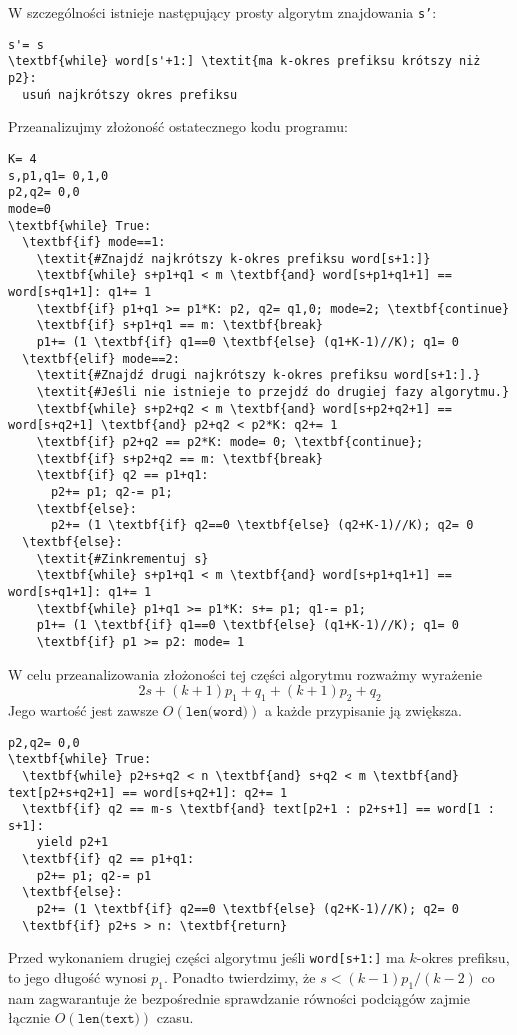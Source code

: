 W szczególności istnieje następujący prosty algorytm znajdowania \texttt{s'}:
\begin{verbatim}
s'= s
\textbf{while} word[s'+1:] \textit{ma k-okres prefiksu krótszy niż p2}:
  usuń najkrótszy okres prefiksu
\end{verbatim}
Przeanalizujmy złożoność ostatecznego kodu programu:
\begin{verbatim}
K= 4
s,p1,q1= 0,1,0
p2,q2= 0,0
mode=0
\textbf{while} True:
  \textbf{if} mode==1:
    \textit{#Znajdź najkrótszy k-okres prefiksu word[s+1:]}
    \textbf{while} s+p1+q1 < m \textbf{and} word[s+p1+q1+1] == word[s+q1+1]: q1+= 1
    \textbf{if} p1+q1 >= p1*K: p2, q2= q1,0; mode=2; \textbf{continue}
    \textbf{if} s+p1+q1 == m: \textbf{break}
    p1+= (1 \textbf{if} q1==0 \textbf{else} (q1+K-1)//K); q1= 0
  \textbf{elif} mode==2:
    \textit{#Znajdź drugi najkrótszy k-okres prefiksu word[s+1:].}
    \textit{#Jeśli nie istnieje to przejdź do drugiej fazy algorytmu.}
    \textbf{while} s+p2+q2 < m \textbf{and} word[s+p2+q2+1] == word[s+q2+1] \textbf{and} p2+q2 < p2*K: q2+= 1
    \textbf{if} p2+q2 == p2*K: mode= 0; \textbf{continue};
    \textbf{if} s+p2+q2 == m: \textbf{break}
    \textbf{if} q2 == p1+q1:
      p2+= p1; q2-= p1;
    \textbf{else}:
      p2+= (1 \textbf{if} q2==0 \textbf{else} (q2+K-1)//K); q2= 0
  \textbf{else}:
    \textit{#Zinkrementuj s}
    \textbf{while} s+p1+q1 < m \textbf{and} word[s+p1+q1+1] == word[s+q1+1]: q1+= 1
    \textbf{while} p1+q1 >= p1*K: s+= p1; q1-= p1;
    p1+= (1 \textbf{if} q1==0 \textbf{else} (q1+K-1)//K); q1= 0
    \textbf{if} p1 >= p2: mode= 1
\end{verbatim}
W celu przeanalizowania złożoności tej części algorytmu rozważmy wyrażenie
\[
2s+{\left(k+1\right)}p_1+q_1+{\left(k+1\right)}p_2+q_2
\]
Jego wartość jest zawsze $O{\left(\texttt{len(word)}\right)}$ a każde przypisanie ją zwiększa.
\begin{verbatim}
p2,q2= 0,0
\textbf{while} True:
  \textbf{while} p2+s+q2 < n \textbf{and} s+q2 < m \textbf{and} text[p2+s+q2+1] == word[s+q2+1]: q2+= 1
  \textbf{if} q2 == m-s \textbf{and} text[p2+1 : p2+s+1] == word[1 : s+1]:
    yield p2+1
  \textbf{if} q2 == p1+q1:
    p2+= p1; q2-= p1
  \textbf{else}:
    p2+= (1 \textbf{if} q2==0 \textbf{else} (q2+K-1)//K); q2= 0
  \textbf{if} p2+s > n: \textbf{return}
\end{verbatim}
Przed wykonaniem drugiej części algorytmu jeśli \texttt{word[s+1:]} ma \(k\)-okres prefiksu, to jego długość wynosi \(p_1\).
Ponadto twierdzimy, że \(s<{\left(k-1\right)}p_1/{\left(k-2\right)}\) co nam zagwarantuje że bezpośrednie sprawdzanie równości podciągów zajmie łącznie $O{\left(\texttt{len(text)}\right)}$ czasu.
